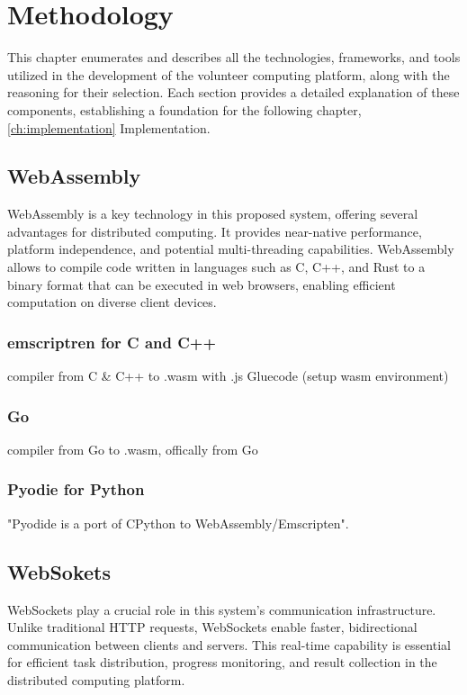 \chapter{Methodology}
\label{ch:methodology}
This chapter enumerates and describes all the technologies, frameworks, and tools utilized in the development of the volunteer computing platform, along with the reasoning for their selection. Each section provides a detailed explanation of these components, establishing a foundation for the following chapter, \ref{ch:implementation} Implementation.

\section{WebAssembly}
\label{sec:methodology:wasm}
WebAssembly is a key technology in this proposed system, offering several advantages for distributed computing. It provides near-native performance, platform independence, and potential multi-threading capabilities. WebAssembly allows to compile code written in languages such as C, C++, and Rust to a binary format that can be executed in web browsers, enabling efficient computation on diverse client devices.

\cite{methodology:wasmdocu, relatedwork:wasmedgecomputing}
\subsection{emscriptren for C and C++}
\label{subsec:methodology:wasm:cpp}
compiler from C \& C++ to .wasm with .js Gluecode (setup wasm environment) \cite{methodology:emcc}
\subsection{Go}
\label{subsec:methodology:wasm:go}
compiler from Go to .wasm, offically from Go \cite{methodology:godocu}
\subsection{Pyodie for Python}
\label{subsec:methodology:wasm:python}
"Pyodide is a port of CPython to WebAssembly/Emscripten". \cite{methodology:pyodie}

\section{WebSokets}
\label{sec:methodology:websokets}
WebSockets play a crucial role in this system's communication infrastructure. Unlike traditional HTTP requests, WebSockets enable faster, bidirectional communication between clients and servers. This real-time capability is essential for efficient task distribution, progress monitoring, and result collection in the distributed computing platform.

